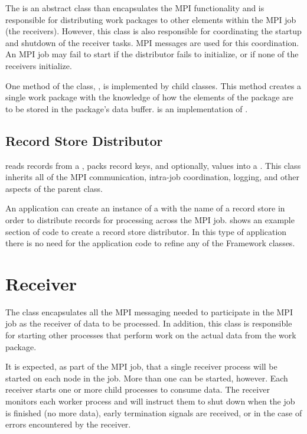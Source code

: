 The  is an abstract class than encapsulates the MPI
functionality and is responsible for distributing work packages to other
elements within the MPI job (the receivers). However, this class
is also responsible for coordinating the startup and shutdown of the receiver
tasks. MPI messages are used for this coordination. An MPI job may fail to
start if the distributor fails to initialize, or if none of the receivers
initialize.

One method of the  class, ,
is implemented by child classes. This method creates a single work package
with the knowledge of how the elements of the package are to be stored
in the package's data buffer.  is an
implementation of .

\subsection{Record Store Distributor}
\label{sec-recordstoredistributor}

 reads records from a ,
packs record keys, and optionally, values into a . This
class inherits all of the MPI communication, intra-job coordination, logging,
and other aspects of the  parent class.

An application can create an instance of a 
with the name of a record store in order to distribute records for
processing across the MPI job.  shows an
example section of code to create a record store distributor. In this
type of application there is no need for the application code to refine
any of the Framework classes.

\section{Receiver}
\label{sec-workpackagereceiver}

The  class encapsulates all the MPI messaging needed to
participate in the MPI job as the receiver of data to be processed. In
addition, this class is responsible for starting other processes that
perform work on the actual data from the work package.

It is expected, as part of the MPI job, that a single receiver process
will be started on each node in the job. More than one can be started,
however. Each receiver starts one or more child processes to
consume data. The receiver monitors each worker process and
will instruct them to shut down when the job is finished (no more data),
early termination signals are received, or in the case of errors
encountered by the receiver.


